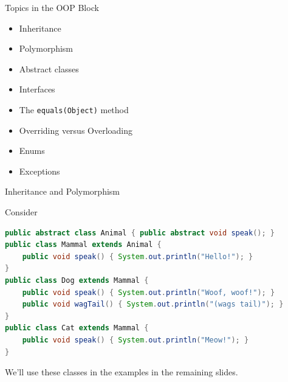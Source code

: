 \documentclass{beamer}
\author[Chris Simpkins] 
{Christopher Simpkins \\\texttt{chris.simpkins@gatech.edu}}
\institute[Georgia Tech] %
\date[CS 1331]{}
\begin{document}
\begin{frame}
  \titlepage
\end{frame}

\begin{frame}[fragile]{Topics in the OOP Block}


\begin{itemize}
\item Inheritance
\item Polymorphism
\item Abstract classes
\item Interfaces
\item The {\tt equals(Object)} method
\item Overriding versus Overloading
\item Enums
\item Exceptions
\end{itemize}


\end{frame}

\begin{frame}[fragile]{Inheritance and Polymorphism}


Consider
\begin{lstlisting}[language=Java]
public abstract class Animal { public abstract void speak(); }
public class Mammal extends Animal {
    public void speak() { System.out.println("Hello!"); }
}
public class Dog extends Mammal {
    public void speak() { System.out.println("Woof, woof!"); }
    public void wagTail() { System.out.println("(wags tail)"); }        
}
public class Cat extends Mammal {
    public void speak() { System.out.println("Meow!"); }  
}
\end{lstlisting}

We'll use these classes in the examples in the remaining slides.

\end{frame}
\end{document}
